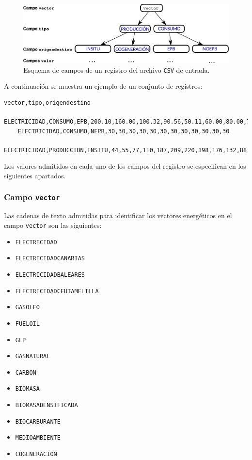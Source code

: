 \documentclass[10pt,notitlepage,oneside,a4paper]{article}
\begin{document}
\begin{figure}[H]
\centering
\includegraphics[width=15cm]{imagenes/esquemavectores}
\caption{Esquema de campos de un registro del archivo \texttt{CSV} de entrada.}
\label{fig:estructuraVectores}
\end{figure}

A continuación se muestra un ejemplo de un conjunto de registros:

\begin{Verbatim}[frame=single]
    vector,tipo,origendestino
    ELECTRICIDAD,CONSUMO,EPB,200.10,160.00,100.32,90.56,50.11,60.00,80.00,70,50,80,120,160
    ELECTRICIDAD,CONSUMO,NEPB,30,30,30,30,30,30,30,30,30,30,30,30
    ELECTRICIDAD,PRODUCCION,INSITU,44,55,77,110,187,209,220,198,176,132,88,55
\end{Verbatim}

Los valores admitidos en cada uno de los campos del registro se especifican en los siguientes apartados.

\subsubsection{Campo \texttt{vector}}

Las cadenas de texto admitidas para identificar los vectores energéticos en el campo \texttt{vector} son las siguientes:

\begin{itemize}
\item \texttt{ELECTRICIDAD}
\item \texttt{ELECTRICIDADCANARIAS}
\item \texttt{ELECTRICIDADBALEARES}
\item \texttt{ELECTRICIDADCEUTAMELILLA}
\item \texttt{GASOLEO}
\item \texttt{FUELOIL}
\item \texttt{GLP}
\item \texttt{GASNATURAL}
\item \texttt{CARBON}
\item \texttt{BIOMASA}
\item \texttt{BIOMASADENSIFICADA}
\item \texttt{BIOCARBURANTE}
\item \texttt{MEDIOAMBIENTE}
\item \texttt{COGENERACION}
\end{itemize}
\end{document}
